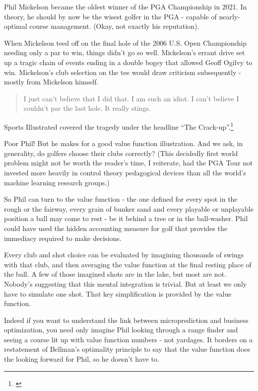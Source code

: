 Phil Mickelson became the oldest winner of the PGA Championship in 2021. In theory, he should by now be the wisest golfer in the PGA - capable of nearly-optimal course management. (Okay, not exactly his reputation). 

When Mickelson teed off on the final hole of the 2006 U.S. Open Championship needing only a par to win, things didn't go so well. Mickelson's errant drive set up a tragic chain of events ending in a double bogey that allowed Geoff Ogilvy to win. Mickelson's club selection on the tee would draw criticism subsequently - mostly from Mickelson himself. 
\begin{quotation}
  I just can't believe that I did that. I am such an idiot. I can't believe I couldn't par the last hole. It really stings.
\end{quotation}
Sports Illustrated covered the tragedy under the headline ``The Crack-up''.\footnote{\cite{sports06}}

Poor Phil! But he makes for a good value function illustration. And we ask, in generality, do golfers choose their clubs correctly? (This decidedly first world problem might not be worth the reader's time, I reiterate, had the PGA Tour not invested more heavily in control theory pedagogical devices than all the world's machine learning research groups.)

So Phil can turn to the value function - the one defined for every spot in the rough or the fairway, every grain of bunker sand and every playable or unplayable position a ball may come to rest - be it behind a tree or in the ball-washer. Phil could have used the hidden accounting measure for golf that provides the immediacy required to make decisions. 

Every club and shot choice can be evaluated by imagining thousands of swings with that club, and then averaging the value function at the final resting place of the ball. A few of those imagined shots are in the lake, but most are not. Nobody's suggesting that this mental integration is trivial. But at least we only have to simulate one shot. That key simplification is provided by the value function.

Indeed if you want to understand the link between microprediction and business optimization, you need only imagine Phil looking through a range finder and seeing a course lit up with value function numbers - not yardages. It borders on a restatement of Bellman's optimality principle to say that the value function does the looking forward for Phil, so he doesn't have to. 

